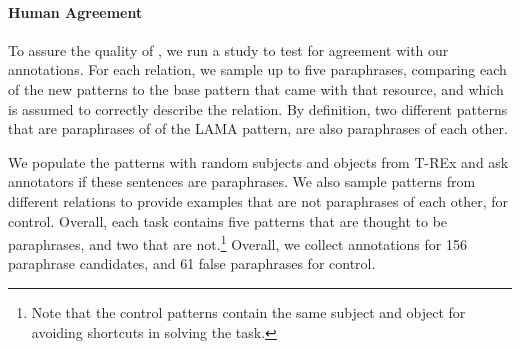 







\paragraph{Human Agreement}
To assure the quality of \resource{}, we run a study to test for agreement with our annotations.
For each relation, we sample up to five paraphrases, comparing each of the new patterns to the base pattern that came with that resource, and which is assumed to correctly describe the relation.
By definition, two different patterns that are paraphrases of of the LAMA pattern, are also paraphrases of each other.

We populate the patterns with random subjects and objects from T-REx \cite{trex} and ask annotators if these sentences are paraphrases.
We also sample patterns from different relations to provide examples that are not paraphrases of each other, for control.
Overall, each task contains five patterns that are thought to be paraphrases, and two that are not.\footnote{Note that the control patterns contain the same subject and object for avoiding shortcuts in solving the task.}
Overall, we collect annotations for 156 paraphrase candidates, and 61 false paraphrases for control.

